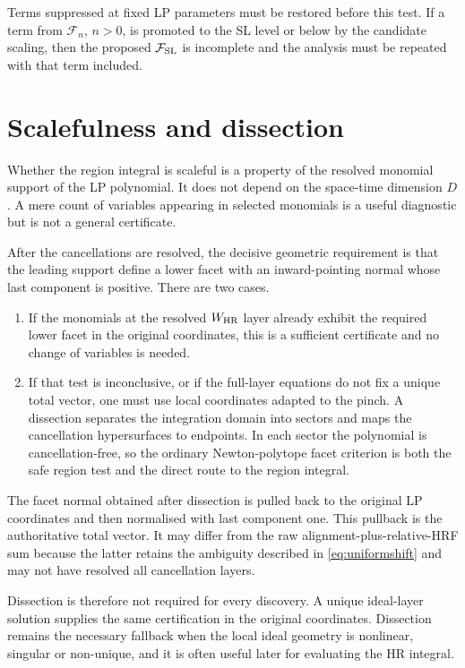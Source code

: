 \documentclass[a4paper,11pt]{article}
\newcommand{\FSL}{\mathcal F_{\rm SL}}
\newcommand{\WHR}{W_{\rm HR}}
\begin{document}
Terms suppressed at fixed LP parameters must be restored before this
test.  If a term from \(\mathcal F_n\), \(n>0\), is promoted to the SL level
or below by the candidate scaling, then the proposed \(\FSL\) is incomplete
and the analysis must be repeated with that term included.

\section{Scalefulness and dissection}
\label{sec:scaleful}

Whether the region integral is scaleful is a property of the resolved
monomial support of the LP polynomial.  It does not depend on the
space-time dimension \(D\).  A mere count of variables appearing in selected
monomials is a useful diagnostic but is not a general certificate.

After the cancellations are resolved, the decisive geometric requirement is
that the leading support define a lower facet with an inward-pointing normal
whose last component is positive.  There are two cases.

\begin{enumerate}[label=(\arabic*)]
\item If the monomials at the resolved \(\WHR\) layer already exhibit the
      required lower facet in the original coordinates, this is a sufficient
      certificate and no change of variables is needed.
\item If that test is inconclusive, or if the full-layer equations do not
      fix a unique total vector, one must use local coordinates adapted to
      the pinch.  A dissection separates the integration domain into sectors
      and maps the cancellation hypersurfaces to endpoints.  In each sector
      the polynomial is cancellation-free, so the ordinary Newton-polytope
      facet criterion is both the safe region test and the direct route to
      the region integral.
\end{enumerate}

The facet normal obtained after dissection is pulled back to the original
LP coordinates and then normalised with last component one.  This
pullback is the authoritative total vector.  It may differ from the raw
alignment-plus-relative-HRF sum because the latter retains the ambiguity described
in \eqref{eq:uniformshift} and may not have resolved all cancellation layers.

Dissection is therefore not required for every discovery.  A unique
ideal-layer solution supplies the same certification in the original
coordinates.  Dissection remains the necessary fallback when the local
ideal geometry is nonlinear, singular or non-unique, and it is often useful
later for evaluating the HR integral.
\end{document}

